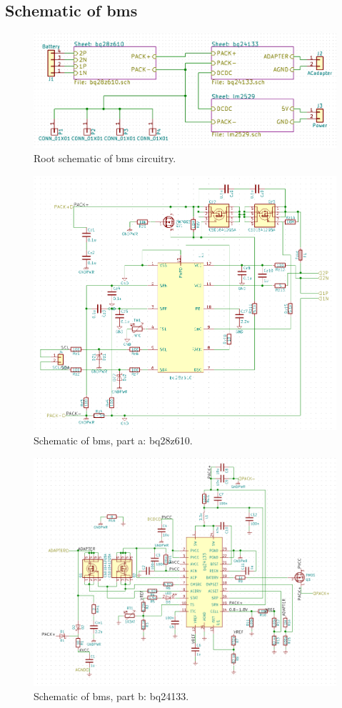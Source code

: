 \subsection{Schematic of \gls{bms}}\label{app:bms}
\begin{figure}[h]
	\centering
    \includegraphics[width=.9\linewidth]{Figures/gasgauge_sch_root.png}
	\caption{Root schematic of \gls{bms} circuitry.}
	\label{fig:schbmsr}
\end{figure}
\begin{figure}[h]
	\centering
    \includegraphics[width=.9\linewidth]{Figures/gasgauge_sch_bq28z610.png}
	\caption{Schematic of \gls{bms}, part a: bq28z610.}
	\label{fig:schbmsr}
\end{figure}
\begin{figure}[h]
	\centering
    \includegraphics[width=\linewidth]{Figures/gasgauge_sch_bq24133.png}
	\caption{Schematic of \gls{bms}, part b: bq24133.}
	\label{fig:schbmsr}
\end{figure}
